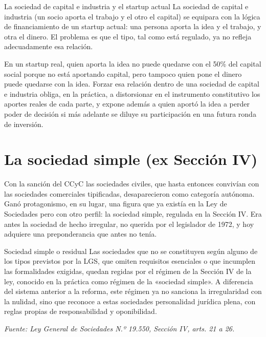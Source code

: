 \documentclass[12pt,oneside]{book}
\begin{document}
\begin{example}{La sociedad de capital e industria y el startup actual}
La sociedad de capital e industria (un socio aporta el trabajo y el otro el capital) se equipara con la lógica de financiamiento de un startup actual: una persona aporta la idea y el trabajo, y otra el dinero. El problema es que el tipo, tal como está regulado, ya no refleja adecuadamente esa relación.

En un startup real, quien aporta la idea no puede quedarse con el 50\% del capital social porque no está aportando capital, pero tampoco quien pone el dinero puede quedarse con la idea. Forzar esa relación dentro de una sociedad de capital e industria obliga, en la práctica, a distorsionar en el instrumento constitutivo los aportes reales de cada parte, y expone además a quien aportó la idea a perder poder de decisión si más adelante se diluye su participación en una futura ronda de inversión.
\end{example}

\section{La sociedad simple (ex Sección IV)}
\label{sec:simple}

Con la sanción del CCyC las sociedades civiles, que hasta entonces convivían con las sociedades comerciales tipificadas, desaparecieron como categoría autónoma. Ganó protagonismo, en su lugar, una figura que ya existía en la Ley de Sociedades pero con otro perfil: la sociedad simple, regulada en la Sección IV. Era antes la sociedad de hecho irregular, no querida por el legislador de 1972, y hoy adquiere una preponderancia que antes no tenía.

\begin{definition}{Sociedad simple o residual}
Las sociedades que no se constituyen según alguno de los tipos previstos por la LGS, que omiten requisitos esenciales o que incumplen las formalidades exigidas, quedan regidas por el régimen de la Sección IV de la ley, conocido en la práctica como régimen de la «sociedad simple». A diferencia del sistema anterior a la reforma, este régimen ya no sanciona la irregularidad con la nulidad, sino que reconoce a estas sociedades personalidad jurídica plena, con reglas propias de responsabilidad y oponibilidad.

\textit{Fuente: Ley General de Sociedades N.º 19.550, Sección IV, arts. 21 a 26.}
\end{definition}
\end{document}
